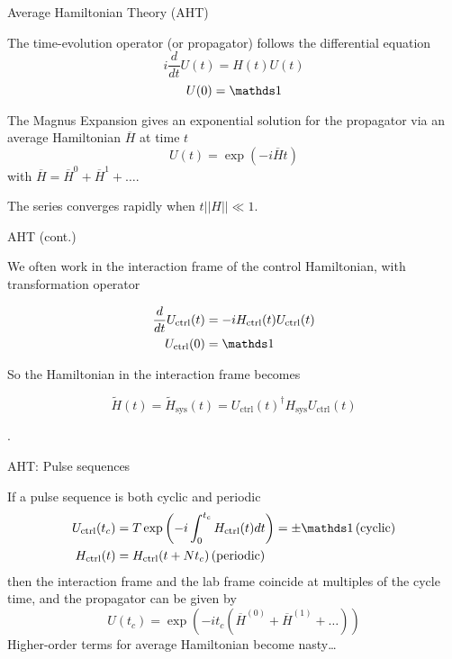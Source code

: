 \documentclass{beamer}
\begin{document}
\begin{frame}{Average Hamiltonian Theory (AHT)}

The time-evolution operator (or propagator) follows the differential
equation \[
i \frac{d}{dt} U(t) = H(t)U(t)
\] \[
U(0) = \identity
\]

The Magnus Expansion gives an exponential solution for the propagator
via an average Hamiltonian \(\overline{H}\) at time \(t\) \[
U(t) = \exp\left( -i \overline{H} t \right)
\] with \(\overline{H} = \overline{H}^0 + \overline{H}^1 + \dots\).

The series converges rapidly when \(t||H|| \ll 1\).

\end{frame}

\begin{frame}{AHT (cont.)}

We often work in the interaction frame of the control Hamiltonian, with transformation operator

\begin{align*}
    \frac{d}{dt} U_{\text{ctrl}}(t) &=
        -i H_{\text{ctrl}}(t)U_{\text{ctrl}}(t) \\
    U_{\text{ctrl}}(0) &= \identity
\end{align*}

So the Hamiltonian in the interaction frame becomes

\[
    \widetilde{H}(t) = \widetilde{H}_{\text{sys}}(t) = U_{\text{ctrl}}(t)^\dagger H_{\text{sys}} U_{\text{ctrl}}(t)
\]

\cite{brinkmann_2016}.
\end{frame}

\begin{frame}{AHT: Pulse sequences}


If a pulse sequence is both cyclic and periodic \cite{gerstein-dybowski}
\begin{align*}
    U_{\text{ctrl}}(t_c) &= T\exp \left(
        -i \int_0^{t_c} H_{\text{ctrl}}(t) dt \right) = \pm \identity
         \, \text{(cyclic)} \\
    H_{\text{ctrl}}(t) &= H_{\text{ctrl}}(t + Nt_c) \, \text{(periodic)}
\end{align*}
then the interaction frame and the lab frame coincide at multiples of
the cycle time, and the propagator can be given by
\[
    U(t_c) = \exp\left( -i t_c (\overline{H}^{(0)} +
        \overline{H}^{(1)} + \dots) \right)
\]
Higher-order terms for average Hamiltonian become nasty\dots

\end{frame}
\end{document}
